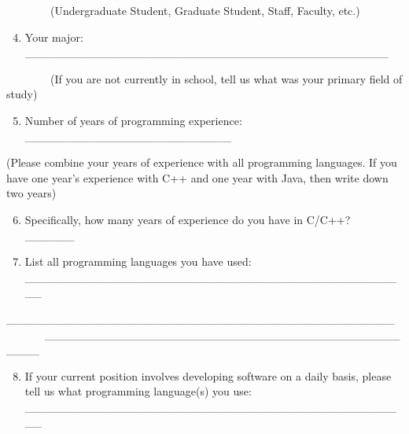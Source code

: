 \documentclass[12pt, a4paper, oneside]{article}
\providecommand{\tightlist}{%
  \setlength{\itemsep}{0pt}\setlength{\parskip}{0pt}}
\begin{document}
{~~~~~~~~}{(Undergraduate Student, Graduate Student, Staff, Faculty,
etc.)}

{}

\begin{enumerate}
\setcounter{enumi}{3}
\tightlist
\item
  {Your major:
  \_\_\_\_\_\_\_\_\_\_\_\_\_\_\_\_\_\_\_\_\_\_\_\_\_\_\_\_\_\_\_\_\_\_\_\_\_\_\_\_\_\_\_\_}
\end{enumerate}

{~~~~~~~~}{(If you are not currently in school, tell us what was your
primary field of study)}

{}

\begin{enumerate}
\setcounter{enumi}{4}
\tightlist
\item
  {Number of years of programming experience:
  \_\_\_\_\_\_\_\_\_\_\_\_\_\_\_\_\_\_\_\_\_\_\_\_\_}
\end{enumerate}

{(Please combine your years of experience with all programming
languages. If you have one year's experience with C++ and one year with
Java, then write down two years)}

{}

\begin{enumerate}
\setcounter{enumi}{5}
\tightlist
\item
  {Specifically, how many years of experience do you have in C/C++?
  \_\_\_\_\_\_}
\end{enumerate}

{}

\begin{enumerate}
\setcounter{enumi}{6}
\tightlist
\item
  {List all programming languages you have used:\\
  \_\_\_\_\_\_\_\_\_\_\_\_\_\_\_\_\_\_\_\_\_\_\_\_\_\_\_\_\_\_\_\_\_\_\_\_\_\_\_\_\_\_\_\_\_\_\_}
\end{enumerate}

{\_\_\_\_\_\_\_\_\_\_\_\_\_\_\_\_\_\_\_\_\_\_\_\_\_\_\_\_\_\_\_\_\_\_\_\_\_\_\_\_\_\_\_\_\_\_\_~~~~~~~~\_\_\_\_\_\_\_\_\_\_\_\_\_\_\_\_\_\_\_\_\_\_\_\_\_\_\_\_\_\_\_\_\_\_\_\_\_\_\_\_\_\_\_\_\_\_\_~~~~~~~~
}

{}

\begin{enumerate}
\setcounter{enumi}{7}
\tightlist
\item
  {If your current position involves developing software on a daily
  basis, please tell us what programming language(s) you use:~~~~~~~~\\
  \_\_\_\_\_\_\_\_\_\_\_\_\_\_\_\_\_\_\_\_\_\_\_\_\_\_\_\_\_\_\_\_\_\_\_\_\_\_\_\_\_\_\_\_\_\_\_}
\end{enumerate}
\end{document}
